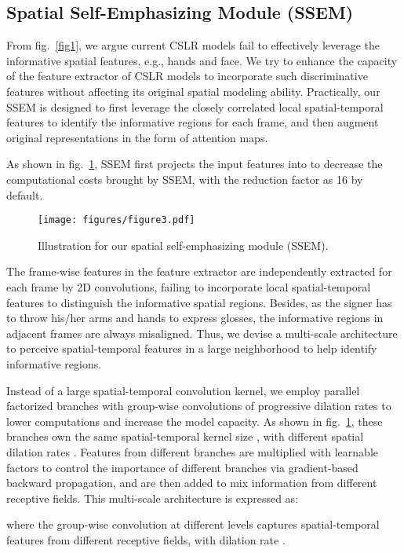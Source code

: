 \documentclass[letterpaper]{article} \usepackage{aaai23}  \usepackage{times}  \usepackage{helvet}  \usepackage{courier}  \usepackage[hyphens]{url}  \usepackage{graphicx} \urlstyle{rm} \def\UrlFont{\rm}  \usepackage{natbib}  \usepackage{caption} \frenchspacing  \setlength{\pdfpagewidth}{8.5in} \setlength{\pdfpageheight}{11in} \usepackage{algorithm}
\begin{document}
\subsection{Spatial Self-Emphasizing Module (SSEM)}
From fig.~\ref{fig1}, we argue current CSLR models fail to effectively leverage the informative spatial features, e.g., hands and face. We try to enhance the capacity of the feature extractor of CSLR models to incorporate such discriminative features without affecting its original spatial modeling ability. Practically, our SSEM is designed to first leverage the closely correlated local spatial-temporal features to identify the informative regions for each frame, and then augment original representations in the form of attention maps.

As shown in fig.~\ref{fig3}, SSEM first projects the input features  into  to decrease the computational costs brought by SSEM, with  the reduction factor as 16 by default.

\begin{figure}[t]
  \centering
  \texttt{[image: figures/figure3.pdf]}
  \caption{Illustration for our spatial self-emphasizing module (SSEM).} \label{fig3}
  \end{figure}

The frame-wise features  in the feature extractor are independently extracted for each frame by 2D convolutions, failing to incorporate local spatial-temporal features to distinguish the informative spatial regions. Besides, as the signer has to throw his/her arms and hands to express glosses, the informative regions in adjacent frames are always misaligned. Thus, we devise a multi-scale architecture to perceive spatial-temporal features in a large neighborhood to help identify informative regions. 

Instead of a large spatial-temporal convolution kernel, we employ  parallel factorized branches with group-wise convolutions of progressive dilation rates to lower computations and increase the model capacity. As shown in fig.~\ref{fig3}, these  branches own the same spatial-temporal kernel size , with different spatial dilation rates . Features from different branches are multiplied with learnable factors  to control the importance of different branches via gradient-based backward propagation, and are then added to mix information from different receptive fields. This multi-scale architecture is expressed as:


where the group-wise convolution  at different levels captures spatial-temporal features from different receptive fields, with dilation rate .
\end{document}
